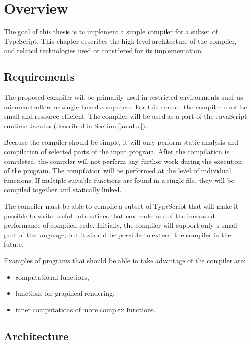 \chapter{Overview}

The goal of this thesis is to implement a simple compiler for a subset of TypeScript. This chapter describes the high-level architecture of the compiler, and related technologies used or considered for its implementation.

\section{Requirements}

The proposed compiler will be primarily used in restricted environments such as microcontrollers or single board computers. For this reason, the compiler must be small and resource efficient. The compiler will be used as a part of the JavaScript runtime Jaculus (described in Section \ref{jaculus}).

Because the compiler should be simple, it will only perform static analysis and compilation of selected parts of the input program. After the compilation is completed, the compiler will not perform any further work during the execution of the program. The compilation will be performed at the level of individual functions. If multiple suitable functions are found in a single file, they will be compiled together and statically linked.

The compiler must be able to compile a subset of TypeScript that will make it possible to write useful subroutines that can make use of the increased performance of compiled code. Initially, the compiler will support only a small part of the language, but it should be possible to extend the compiler in the future.

Examples of programs that should be able to take advantage of the compiler are:
\begin{itemize}
    \item computational functions,
    \item functions for graphical rendering,
    \item inner computations of more complex functions.
\end{itemize}

\section{Architecture}

